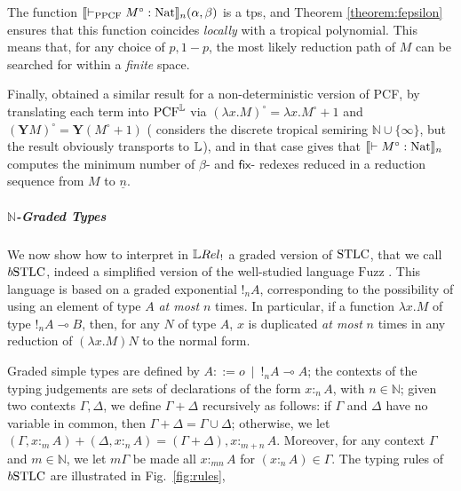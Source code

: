 \begin{remark}
The function $\llbracket\vdash_{\mathrm{PPCF}} M^{\circ}:\mathrm{Nat}\rrbracket_{n}(\alpha,\beta)$ is a tps, and Theorem \ref{theorem:fepsilon} ensures that this function coincides \emph{locally} with a tropical polynomial. This means that, for any choice of $p,1-p$, the most likely reduction path of $M$ can be searched for within a \emph{finite} space.
\end{remark}

Finally, \cite{Manzo2013} obtained a similar result for a non-deterministic version of PCF, by translating each term into $\mathrm{PCF}^{\mathbb{L}}$ via $(\lambda x.M)^{\circ}=\lambda x.M^{\circ}+1$ and $(\mathbf YM)^{\circ}= \mathbf Y(M^{\circ}+1)$
(\cite{Manzo2013} considers the discrete tropical semiring $\mathbb N\cup\{\infty\}$, but the result obviously transports to $\mathbb{L}$), and in that case \cite[Corollary VI.10]{Manzo2013} gives that $\llbracket\vdash M^{\circ}:\mathrm{Nat}\rrbracket_{n}$ computes the minimum number of $\beta$- and $\mathsf{fix}$- redexes reduced in a reduction sequence from $M $ to $\underline n$. 


 

\subparagraph*{$\mathbb N$-Graded Types}\label{sec:BSTLC}

We now show how to interpret in $\LREL_{!}$ a graded version of $\mathrm{STLC}$, that we call $\BSTLC$, indeed a simplified version of the well-studied language $\mathrm{Fuzz}$ \cite{Reed2010}.
This language is based on a graded exponential $!_{n}A$, corresponding to the possibility of using an element of type $A$ \emph{at most} $n$ times. In particular, if a function $ \lambda x.M$ of type $!_nA\multimap B$, then, for any $N$ of type $A$, $x$ is duplicated \emph{at most} $n$ times in any reduction of $(\lambda x.M)N $ to the normal form.

Graded simple types are defined by $A::= o \ \mid  \ !_{n}A \multimap A$; the contexts of the typing judgements are sets of declarations of the form $x :_{n}A$, with $n\in \mathbb N$;
given two contexts $\Gamma,\Delta$, we define $\Gamma+\Delta$ recursively as follows: if $\Gamma$ and $\Delta$ have no variable in common, then $\Gamma+\Delta=\Gamma\cup \Delta$; otherwise, we let $(\Gamma, x:_{m} A)+( \Delta, x:_{n} A) =  (\Gamma+\Delta), x:_{m+n}A$. 
Moreover, for any context $\Gamma$ and $m\in \mathbb N$, we let $m\Gamma$ be made all $x:_{mn}A$ for $(x:_{n}A) \in \Gamma$.  
The  typing rules of $\BSTLC$ are illustrated in Fig.~\ref{fig:rules}, 


